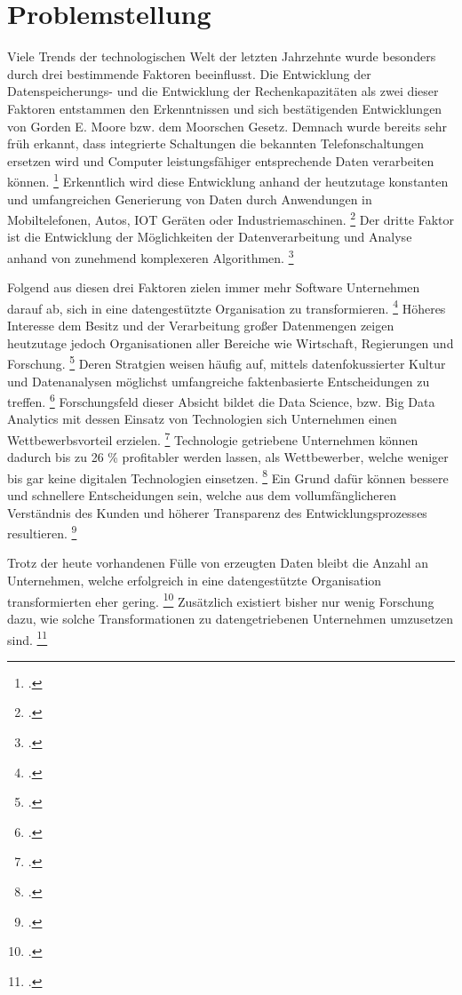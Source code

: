 \chapter[Problemstellung]{Problemstellung}

Viele Trends der technologischen Welt der letzten Jahrzehnte wurde besonders durch drei bestimmende Faktoren beeinflusst.
Die Entwicklung der Datenspeicherungs- und die Entwicklung der Rechenkapazitäten als zwei dieser Faktoren entstammen den Erkenntnissen und sich bestätigenden Entwicklungen von Gorden E. Moore bzw. dem Moorschen Gesetz. \parencite[Vgl.][S. 1]{Moore.1998} %
Demnach wurde bereits sehr früh erkannt, dass integrierte Schaltungen die bekannten Telefonschaltungen ersetzen wird und Computer leistungsfähiger entsprechende Daten verarbeiten können. \footcite[Vgl.][S. 1]{Moore.1998}
Erkenntlich wird diese Entwicklung anhand der heutzutage konstanten und umfangreichen Generierung von Daten durch Anwendungen in Mobiltelefonen, Autos, IOT Geräten oder Industriemaschinen. \footcite[Vgl.][S 3f.]{Dalpiaz.2020}
Der dritte Faktor ist die Entwicklung der Möglichkeiten der Datenverarbeitung und Analyse anhand von zunehmend komplexeren Algorithmen. \footcite[Vgl.][S. 4]{Dalpiaz.2020}

Folgend aus diesen drei Faktoren zielen immer mehr Software Unternehmen darauf ab, sich in eine datengestützte Organisation zu transformieren. \footcite[Vgl.][S. 1]{Fabijan.2017}
Höheres Interesse dem Besitz und der Verarbeitung großer Datenmengen zeigen heutzutage jedoch Organisationen aller Bereiche wie Wirtschaft, Regierungen und Forschung. \footcite[Vgl.][S. 1]{Pratt.2023}
Deren Stratgien weisen häufig auf, mittels datenfokussierter Kultur und Datenanalysen möglichst umfangreiche faktenbasierte Entscheidungen zu treffen. \footcite[Vgl.][S. 18]{Dalpiaz.2020}
Forschungsfeld dieser Absicht bildet die Data Science, bzw. Big Data Analytics mit dessen Einsatz von Technologien sich Unternehmen einen Wettbewerbsvorteil erzielen. \footcite[Vgl.][S. 3]{Dalpiaz.2020}
Technologie getriebene Unternehmen können dadurch bis zu 26 \% profitabler werden lassen, als Wettbewerber, welche weniger bis gar keine digitalen Technologien einsetzen. \footcite[Vgl.][S. 1]{Fabijan.2017}
Ein Grund dafür können bessere und schnellere Entscheidungen sein, welche aus dem vollumfänglicheren Verständnis des Kunden und höherer Transparenz des Entwicklungsprozesses resultieren. \footcite[Vgl.][S. 18]{Dalpiaz.2020}

Trotz der heute vorhandenen Fülle von erzeugten Daten bleibt die Anzahl an Unternehmen, welche erfolgreich in eine datengestützte Organisation transformierten eher gering. \footcite[Vgl.][S. 1]{Fabijan.2017}
Zusätzlich existiert bisher nur wenig Forschung dazu, wie solche Transformationen zu datengetriebenen Unternehmen umzusetzen sind. \footcite[Vgl.][S. 1]{Fabijan.2017}

